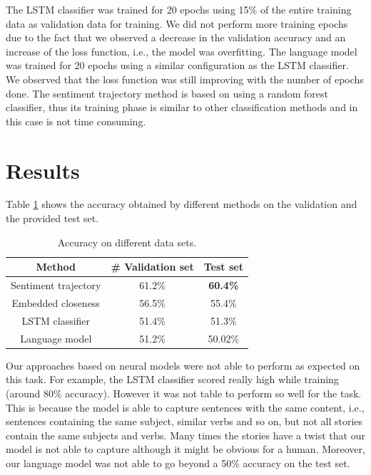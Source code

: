 \documentclass{article}
\newcommand{\lstm}{LSTM }
\begin{document}
The \lstm classifier was trained for 20 epochs using 15\% of the entire training
data as validation data for training. We did not perform more training epochs
due to the fact that we observed a decrease in the validation accuracy and an
increase of the loss function, i.e., the model was overfitting.  The language
model was trained for 20 epochs using a similar configuration as the \lstm
classifier. We observed that the loss function was still improving with the
number of epochs done. The sentiment trajectory method is based on using a
random forest classifier, thus its training phase is similar to other
classification methods and in this case is not time consuming.

\section{Results}
\label{sec:results}

Table \ref{tab:results} shows the accuracy obtained by different methods on the
validation and the provided test set. 

\begin{table}
    \caption{Accuracy on different data sets.}
    \begin{center}
        \label{tab:results}
        \begin{tabular}{||c c c||} 
            \hline
            Method                 & \# Validation set         & Test set \\ [0.5ex] 
            \hline\hline
            Sentiment trajectory   & 61.2\%                    & \textbf{60.4\%} \\ 
            \hline
            Embedded closeness     & 56.5\%                    & 55.4\% \\
            \hline
            LSTM classifier        & 51.4\%                    & 51.3\% \\ 
            \hline
            Language model         & 51.2\%                    & 50.02\% \\ [1ex] 
            \hline
        \end{tabular}
    \end{center}
\end{table}

Our approaches based on neural models were not able to perform as expected on
this task. For example, the \lstm classifier scored really high while training
(around 80\% accuracy). However it was not table to perform so well for the
task. This is because the model is able to capture sentences with the same
content, i.e., sentences containing the same subject, similar verbs and so on,
but not all stories contain the same subjects and verbs. Many times the stories
have a twist that our model is not able to capture although it might be obvious
for a human. Moreover, our language model was not able to go beyond a 50\%
accuracy on the test set. 
\end{document}
